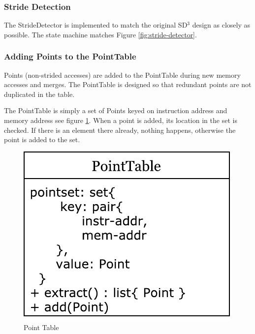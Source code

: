 \documentclass[12pt,twoside]{reedthesis}
\begin{document}
		
		\subsubsection{Stride Detection}
		
		The StrideDetector is implemented to match the original SD$^3$ design as closely as possible. The state machine matches Figure \ref{fig:stride-detector}.
		
		\subsubsection{Adding Points to the PointTable}
		
			Points (non-strided accesses) are added to the PointTable during new memory accesses and merges. The PointTable is designed so that redundant points are not duplicated in the table. 
			
			The PointTable is simply a set of Points keyed on instruction address and memory address see figure \ref{fig:point-table}. When a point is added, its location in the set is checked. If there is an element there already, nothing happens, otherwise the point is added to the set. 
			
			\begin{figure}[h]
				\caption{Point Table}
				\label{fig:point-table}
				\includegraphics[scale=0.8]{point_data.pdf}
			\end{figure}
		
			
			
\end{document}
